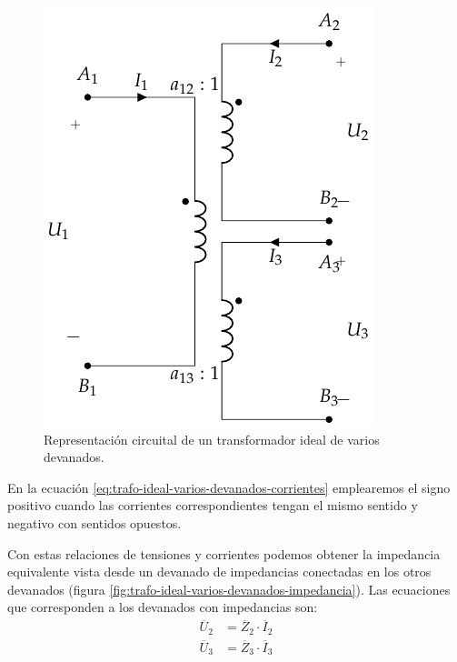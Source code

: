 \begin{figure}
  \centering
  \includegraphics[height=0.25\textheight]{../figs/TrafoIdealVariosDevanados.pdf}
  \caption{Representación circuital de un transformador ideal de varios devanados.}
  \label{fig:trafo-ideal-varios-devanados}
\end{figure}

En la ecuación \ref{eq:trafo-ideal-varios-devanados-corrientes} emplearemos el signo positivo cuando las corrientes correspondientes tengan el mismo sentido y negativo con sentidos opuestos.

Con estas relaciones de tensiones y corrientes podemos obtener la impedancia equivalente vista desde un devanado de impedancias conectadas en los otros devanados (figura \ref{fig:trafo-ideal-varios-devanados-impedancia}). Las ecuaciones que corresponden a los devanados con impedancias son:
\begin{align*}
  \overline{U}_2 &= \overline{Z}_2 \cdot \overline{I}_2\\
  \overline{U}_3 &= \overline{Z}_3 \cdot \overline{I}_3
\end{align*}

